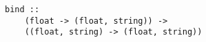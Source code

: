 \begin{verbatim}
bind ::
    (float -> (float, string)) ->
    ((float, string) -> (float, string))
\end{verbatim}
